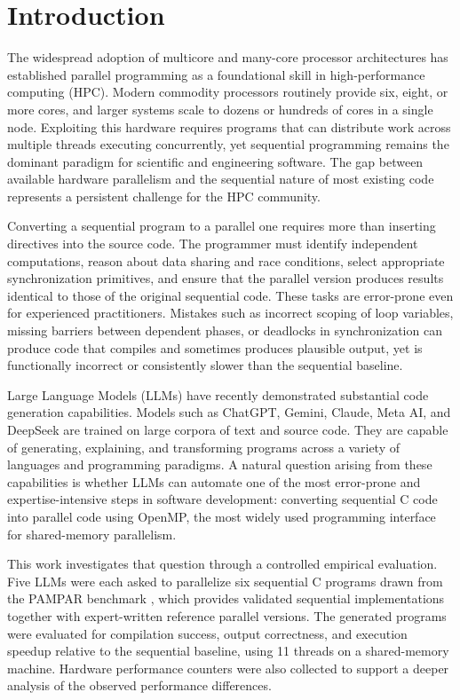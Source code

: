 \chapter{Introduction}\label{cap:introducao}

The widespread adoption of multicore and many-core processor architectures has established parallel programming as a foundational skill in high-performance computing (HPC). 
Modern commodity processors routinely provide six, eight, or more cores, and larger systems scale to dozens or hundreds of cores in a single node. 
Exploiting this hardware requires programs that can distribute work across multiple threads executing concurrently, yet sequential programming remains the dominant paradigm for scientific and engineering software. 
The gap between available hardware parallelism and the sequential nature of most existing code represents a persistent challenge for the HPC community.

Converting a sequential program to a parallel one requires more than inserting directives into the source code. 
The programmer must identify independent computations, reason about data sharing and race conditions, select appropriate synchronization primitives, and ensure that the parallel version produces results identical to those of the original sequential code. 
These tasks are error-prone even for experienced practitioners. 
Mistakes such as incorrect scoping of loop variables, missing barriers between dependent phases, or deadlocks in synchronization can produce code that compiles and sometimes produces plausible output, yet is functionally incorrect or consistently slower than the sequential baseline.

Large Language Models (LLMs) have recently demonstrated substantial code generation capabilities. 
Models such as ChatGPT, Gemini, Claude, Meta AI, and DeepSeek are trained on large corpora of text and source code.
They are capable of generating, explaining, and transforming programs across a variety of languages and programming paradigms. 
A natural question arising from these capabilities is whether LLMs can automate one of the most error-prone and expertise-intensive steps in software development: converting sequential C code into parallel code using OpenMP, the most widely used programming interface for shared-memory parallelism.

This work investigates that question through a controlled empirical evaluation. 
Five LLMs were each asked to parallelize six sequential C programs drawn from the PAMPAR benchmark , which provides validated sequential implementations together with expert-written reference parallel versions. 
The generated programs were evaluated for compilation success, output correctness, and execution speedup relative to the sequential baseline, using 11 threads on a shared-memory machine. 
Hardware performance counters were also collected to support a deeper analysis of the observed performance differences.

